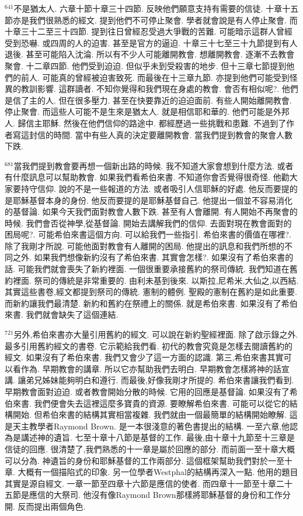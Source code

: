 \documentclass{book}
\begin{document}
$^{641}$不是猶太人.
六章十節十章三十四節.
反映他們願意支持有需要的信徒.
十章十五節亦是我們很熟悉的經文.
提到他們不可停止聚會.
學者就會說是有人停止聚會.
而十章三十二至三十四節.
提到往日曾經忍受過大爭戰的苦難.
可能暗示這群人曾經受到恐嚇.
或四周的人的迫害.
甚至是官方的逼迫.
十章三十七至三十九節提到有人退後.
甚至可能陷入沈淪.
所以有不少人可能離開教會.
想離開教會.
逐漸不去教會聚會.
十二章四節.
他們受到迫迫.
但似乎未到受殺害的地步.
但十三章七節提到他們的前人.
可能真的曾經被迫害致死.
而最後在十三章九節.
亦提到他們可能受到怪異的教訓影響.
這群讀者.
不知你覺得和我們現在身處的教會.
會否有相似呢?.
他們是信了主的人.
但在很多壓力.
甚至在快要靠近的迫迫面前.
有些人開始離開教會.
停止聚會.
而這些人可能不是生來是猶太人.
就是相信耶和華的.
他們可能是外邦人.
歸信主耶穌.
然後在他們信仰的路途中.
都經歷過一些挑戰和患難.
不過到了作者寫這封信的時間.
當中有些人真的決定要離開教會.
當我們提到教會的聚會人數下跌.

$^{681}$當我們提到教會要再想一個新出路的時候.
我不知道大家會想到什麼方法.
或者有什麼訊息可以幫助教會.
如果我們看希伯來書.
不知道你會否覺得很奇怪.
他勸大家要持守信仰.
說的不是一些報道的方法.
或者吸引人信耶穌的好處.
他反而要提的是耶穌基督本身的身份.
他反而要提的是耶穌基督自己.
他提出一個並不容易消化的基督論.
如果今天我們面對教會人數下跌.
甚至有人會離開.
有人開始不再聚會的時候.
我們會否從神學,從基督論.
開始去講解我們的信仰.
去面對現在教會面對的困局呢?.
可能希伯來書這個方向.
可以給我們一些指引.
希伯來書的價值在哪裡?.
除了我剛才所說.
可能他面對教會有人離開的困局.
他提出的訊息和我們所想的不同之外.
如果我們想像新約沒有了希伯來書.
其實會怎樣?.
如果沒有了希伯來書的話.
可能我們就會喪失了新約裡面.
一個很重要承接舊約的祭司傳統.
我們知道在舊約裡面.
祭司的傳統是非常重要的.
由利未基到後來.
以斯拉,尼希米,大仙之,以西結.
其實這些書卷,經文都提到祭司的傳統.
憲制的體例.
聖殿的憲制在舊約是如此重要.
而新約讓我們最清楚.
新約和舊約在祭禮上的關係.
就是希伯來書.
如果沒有了希伯來書.
我們就會缺失了這個連結.

$^{721}$另外,希伯來書亦大量引用舊約的經文.
可以說在新約聖經裡面.
除了啟示錄之外.
最多引用舊約經文的書卷.
它示範給我們看.
初代的教會究竟是怎樣去閱讀舊約的經文.
如果沒有了希伯來書.
我們又會少了這一方面的認識.
第三,希伯來書其實可以看作為.
早期教會的講章.
所以它亦幫助我們去明白.
早期教會怎樣將神的話宣講.
讓弟兄姊妹能夠明白和遵行.
而最後,好像我剛才所提的.
希伯來書讓我們看到.
早期教會面對迫迫.
或者教會開始分散的時候.
它用的回應是基督論.
如果沒有了希伯來書.
我們便會失去這裡這麼多寶貴的資源.
要瞭解希伯來書.
可能可以從它的結構開始.
但希伯來書的結構其實相當複雜.
我們就由一個最簡單的結構開始瞭解.
這是天主教學者Raymond Brown.
是一本很淺意的著色書提出的結構.
一至六章,他認為是講述神的遺旨.
七至十章十八節是基督的工作.
最後,由十章十九節至十三章是信徒的回應.
很清楚了,我們熟悉的十一章是屬於回應的部分.
而前面一至十章大概可以分為.
神遺旨的身份和耶穌基督的工作兩部分.
這個框架幫助我們對於一至十章.
大概有一個描陷式的印象.
另一位學者Westphal的結構再深入一點.
他用的題目其實是源自經文.
一章一節至四章十六節是應信的使者.
而四章十一節至十章二十五節是應信的大祭司.
他沒有像Raymond Brown那樣將耶穌基督的身份和工作分開.
反而提出兩個角色.
\end{document}
